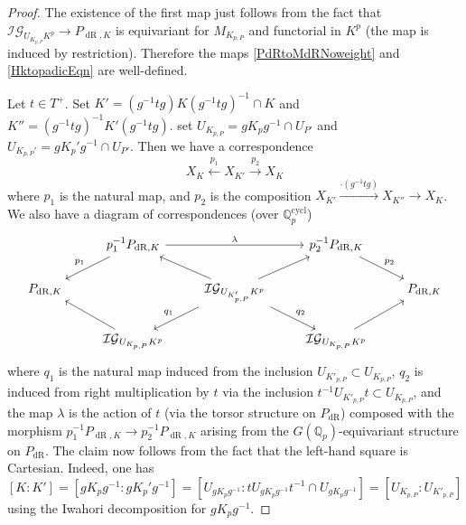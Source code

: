 \documentclass[10pt, oneside]{amsart}
\numberwithin{equation}{subsection}
\theoremstyle{definition}
\theoremstyle{remark}
\newcommand{\mbb}[1]{\mathbb{#1}}
\newcommand{\opn}[1]{\operatorname{#1}}
\begin{document}
\begin{proof}
The existence of the first map just follows from the fact that $\mathcal{IG}_{U_{K_{p, P}} K^p} \to P_{\opn{dR}, K}$ is equivariant for $M_{K_{p, P}}$ and functorial in $K^p$ (the map is induced by restriction). Therefore the maps \eqref{PdRtoMdRNoweight} and \eqref{HktopadicEqn} are well-defined.

Let $t \in T^+$. Set $K' = (g^{-1}tg) K (g^{-1}tg)^{-1} \cap K$ and $K'' = (g^{-1}tg)^{-1}K' (g^{-1}tg)$. set $U_{K_{p, P}} = g K_p g^{-1} \cap U_{P'}$ and $U_{K_{p, P}'} = g K_p' g^{-1} \cap U_{P'}$. Then we have a correspondence 
\[
X_{K} \xleftarrow{p_1} X_{K'} \xrightarrow{p_2} X_K
\]
where $p_1$ is the natural map, and $p_2$ is the composition $X_{K'} \xrightarrow{\cdot (g^{-1}tg)} X_{K''} \to X_{K}$. We also have a diagram of correspondences (over $\mbb{Q}_p^{\opn{cycl}}$)
\[
\begin{tikzcd}
                  & {p_1^{-1}P_{\opn{dR}, K}} \arrow[ld, "p_1"'] \arrow[rr, "\lambda"] &                                                                                              & {p_2^{-1}P_{\opn{dR}, K}} \arrow[rd, "p_2"] &                   \\
{P_{\opn{dR}, K}} &                                                                    & {\mathcal{IG}_{U_{K'_{p, P}}K^p}} \arrow[lu] \arrow[ru] \arrow[ld, "q_1"'] \arrow[rd, "q_2"] &                                             & {P_{\opn{dR}, K}} \\
                  & {\mathcal{IG}_{U_{K_{p, P}}K^p}} \arrow[lu]                        &                                                                                              & {\mathcal{IG}_{U_{K_{p, P}}K^p}} \arrow[ru] &                  
\end{tikzcd}
\]
where $q_1$ is the natural map induced from the inclusion $U_{K'_{p, P}} \subset U_{K_{p, P}}$, $q_2$ is induced from right multiplication by $t$ via the inclusion $t^{-1}U_{K'_{p, P}} t \subset U_{K_{p, P}}$, and the map $\lambda$ is the action of $t$ (via the torsor structure on $P_{\opn{dR}}$) composed with the morphism $p_1^{-1}P_{\opn{dR}, K} \to p_2^{-1}P_{\opn{dR}, K}$ arising from the $G(\mbb{Q}_p)$-equivariant structure on $P_{\opn{dR}}$. The claim now follows from the fact that the left-hand square is Cartesian. Indeed, one has 
\[
[K : K'] = [gK_pg^{-1}: gK_p'g^{-1}] = [U_{gK_pg^{-1}} : tU_{gK_pg^{-1}}t^{-1} \cap U_{gK_pg^{-1}}] = [U_{K_{p, P}} : U_{K'_{p, P}}]
\]
using the Iwahori decomposition for $gK_pg^{-1}$.
\end{proof}
\end{document}
